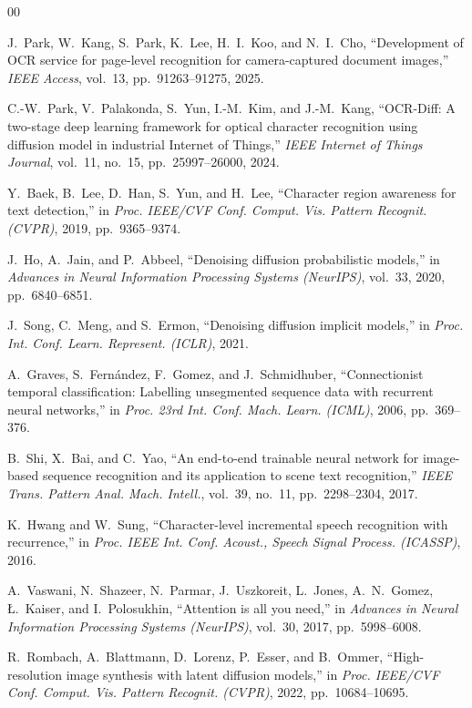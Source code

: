 \documentclass[conference]{IEEEtran}
\begin{document}
\begin{thebibliography}{00}

J.~Park, W.~Kang, S.~Park, K.~Lee, H.~I.~Koo, and N.~I.~Cho,
``Development of OCR service for page-level recognition for camera-captured document images,''
\textit{IEEE Access}, vol.~13, pp.~91263--91275, 2025.

C.-W.~Park, V.~Palakonda, S.~Yun, I.-M.~Kim, and J.-M.~Kang,
``OCR-Diff: A two-stage deep learning framework for optical character recognition using diffusion model in industrial Internet of Things,''
\textit{IEEE Internet of Things Journal}, vol.~11, no.~15, pp.~25997--26000, 2024.

Y.~Baek, B.~Lee, D.~Han, S.~Yun, and H.~Lee,
``Character region awareness for text detection,''
in \textit{Proc. IEEE/CVF Conf. Comput. Vis. Pattern Recognit. (CVPR)}, 2019, pp.~9365--9374.

J.~Ho, A.~Jain, and P.~Abbeel,
``Denoising diffusion probabilistic models,''
in \textit{Advances in Neural Information Processing Systems (NeurIPS)}, vol.~33, 2020, pp.~6840--6851.

J.~Song, C.~Meng, and S.~Ermon,
``Denoising diffusion implicit models,''
in \textit{Proc. Int. Conf. Learn. Represent. (ICLR)}, 2021.

A.~Graves, S.~Fern\'{a}ndez, F.~Gomez, and J.~Schmidhuber,
``Connectionist temporal classification: Labelling unsegmented sequence data with recurrent neural networks,''
in \textit{Proc. 23rd Int. Conf. Mach. Learn. (ICML)}, 2006, pp.~369--376.

B.~Shi, X.~Bai, and C.~Yao,
``An end-to-end trainable neural network for image-based sequence recognition and its application to scene text recognition,''
\textit{IEEE Trans. Pattern Anal. Mach. Intell.}, vol.~39, no.~11, pp.~2298--2304, 2017.

K.~Hwang and W.~Sung,
``Character-level incremental speech recognition with recurrence,''
in \textit{Proc. IEEE Int. Conf. Acoust., Speech Signal Process. (ICASSP)}, 2016.

A.~Vaswani, N.~Shazeer, N.~Parmar, J.~Uszkoreit, L.~Jones, A.~N.~Gomez, {\L}.~Kaiser, and I.~Polosukhin,
``Attention is all you need,''
in \textit{Advances in Neural Information Processing Systems (NeurIPS)}, vol.~30, 2017, pp.~5998--6008.

R.~Rombach, A.~Blattmann, D.~Lorenz, P.~Esser, and B.~Ommer,
``High-resolution image synthesis with latent diffusion models,''
in \textit{Proc. IEEE/CVF Conf. Comput. Vis. Pattern Recognit. (CVPR)}, 2022, pp.~10684--10695.

\end{thebibliography}
\end{document}
